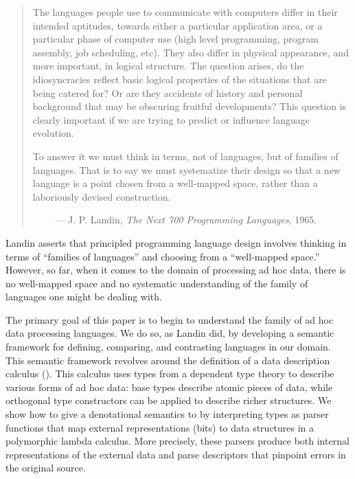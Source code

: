 \begin {quote}
The languages people use to communicate with computers differ in their intended aptitudes, towards either a
particular application area, or a particular phase of computer use (high level programming, program assembly,
job scheduling, etc). They also differ in physical appearance, and more important, in logical structure. The question arises, do the idiosyncracies reflect basic logical
properties of the situations that are being catered for?
Or are they accidents of history and personal background
that may be obscuring fruitful developments? This
question is clearly important if we are trying to predict or
influence language evolution.

To answer it we must think in terms, not of languages,
but of families of languages. That is to say we must
systematize their design so that a new language is a point
chosen from a well-mapped space, rather than a laboriously
devised construction.

$\qquad$ --- J. P. Landin, {\em The Next 700 Programming Languages}, 1965.
\end{quote}

Landin asserts that principled programming language design
involves thinking in terms of ``families of languages'' and
choosing from a ``well-mapped space.''  However, so far,
when it comes to the domain of processing ad hoc data, 
there is no well-mapped space and no systematic understanding
of the family of languages one might be dealing with.

The primary goal of this paper is to begin to understand the
family of ad hoc data processing languages.  We do so,
as Landin did, by developing a semantic
framework for defining, comparing, and contrasting languages
in our domain.  This semantic framework revolves around the
definition of a data description calculus (\ddc{}).  
This calculus uses types from a dependent type theory to describe
various forms of ad hoc data:
base types describe atomic pieces of data, while
orthogonal type constructors can be applied to describe richer structures.
We show how to give a denotational semantics
to \ddc{} by interpreting
types as parser functions that map external representations (bits)
to data structures in a polymorphic lambda calculus.  More precisely,
these parsers produce both 
internal representations of the external data and
parse descriptors that pinpoint errors in the original source.

